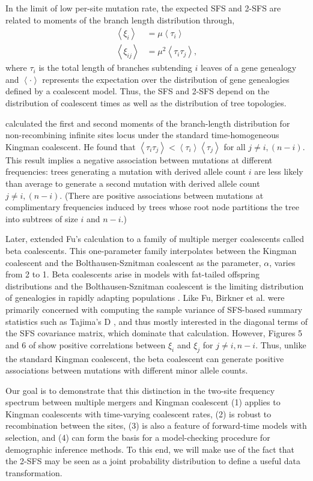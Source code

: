 \documentclass[11pt, letterpaper]{article}   	%
\newcommand{\E}[1]{\left< #1 \right>}
\begin{document}
In the limit of low per-site mutation rate, the expected SFS and 2-SFS are related to moments of the branch length distribution through,
\begin{align}
    \E{\xi_i} &= \mu \E{\tau_i} \\
    \E{\xi_{ij}} &= \mu^2 \E{\tau_i \tau_j},
\end{align}
where $\tau_i$ is the total length of branches subtending $i$ leaves of a gene genealogy and $\E{\cdot}$ represents the expectation over the distribution of gene genealogies defined by a coalescent model.
Thus, the SFS and 2-SFS depend on the distribution of coalescent times as well as the distribution of tree topologies.

\cite{Fu1995} calculated the first and second moments of the branch-length distribution for non-recombining infinite sites locus under the standard time-homogeneous Kingman coalescent.
He found that $\E{\tau_i \tau_j} < \E{\tau_i}\E{\tau_j}$ for all $j \neq i, (n-i)$.
This result implies a negative association between mutations at different frequencies: trees generating a mutation with derived allele count $i$ are less likely than average to generate a second mutation with derived allele count $j \neq i, (n-i)$.
(There are positive associations between mutations at complimentary frequencies induced by trees whose root node partitions the tree into subtrees of size $i$ and $n-i$.)

Later, \cite{BirknerEtAl2013} extended Fu's calculation to a family of multiple merger coalescents called beta coalescents.
This one-parameter family interpolates between the Kingman coalescent and the Bolthausen-Sznitman coalescent as the parameter, $\alpha$, varies from 2 to 1.
Beta coalescents arise in models with fat-tailed offspring distributions \autocite{Schweinsberg2003} and the Bolthausen-Sznitman coalescent is the limiting distribution of genealogies in rapidly adapting populations \cite{NeherHallatscheck2013}.
Like Fu, Birkner et al. were primarily concerned with computing the sample variance of SFS-based summary statistics such as Tajima's D \autocite{Tajima1989}, and thus mostly interested in the diagonal terms of the SFS covariance matrix, which dominate that calculation.
However, Figures 5 and 6 of \cite{BirknerEtAl2013} show positive correlations between $\xi_i$ and $\xi_j$ for $j \neq i, n-i$.
Thus, unlike the standard Kingman coalescent, the beta coalescent can generate positive associations between mutations with different minor allele counts.

Our goal is to demonstrate that this distinction in the two-site frequency spectrum between multiple mergers and Kingman coalescent
(1) applies to Kingman coalescents with time-varying coalescent rates,
(2) is robust to recombination between the sites,
(3) is also a feature of forward-time models with selection,
and (4) can form the basis for a model-checking procedure for demographic inference methods.
To this end, we will make use of the fact that the 2-SFS may be seen as a joint probability distribution to define a useful data transformation.
\end{document}
